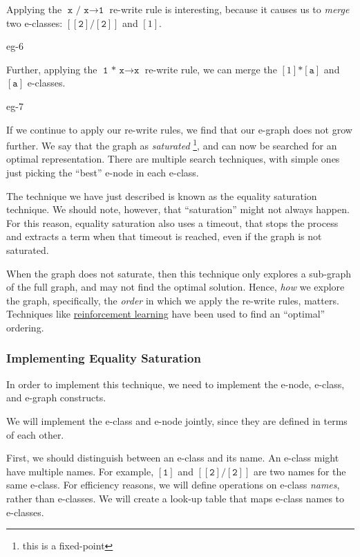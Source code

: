 Applying the $\texttt{x / x} \to \texttt{1}$ re-write rule is interesting, because it causes us to \textit{merge} two e-classes: 
$[[\texttt{2}] \texttt{/} [\texttt{2}]]$ and $[1]$.

\begin{center}
  {eg-6}
\end{center}

Further, applying the $\texttt{1 * x} \to \texttt{x}$ re-write rule, we can merge the $[1]\texttt{*}[\texttt{a}]$ and $[\texttt{a}]$ e-classes.

\begin{center}
  {eg-7}
\end{center}

If we continue to apply our re-write rules, we find that our e-graph does not grow further. We say that the graph as \textit{saturated} \footnote{this is a fixed-point}, and can 
now be searched for an optimal representation. There are multiple search techniques, with simple ones just picking the ``best'' e-node in each e-class. 

The technique we have just described is known as the equality saturation technique. We should note, however, that ``saturation'' might not always happen. 
For this reason, equality saturation also uses a timeout, that stops the process and extracts a term when that timeout is reached, even if the graph is not saturated. 

When the graph does not saturate, then this technique only explores a sub-graph of the full graph, and may not find the optimal solution. Hence, \textit{how} we explore the graph, 
specifically, the \textit{order} in which we apply the re-write rules, matters. Techniques like \href{https://www.cl.cam.ac.uk/~ey204/pubs/MPHIL_P3/2022_Zak.pdf}{reinforcement learning}
have been used to find an ``optimal'' ordering. 

\subsubsection{Implementing Equality Saturation}
In order to implement this technique, we need to implement the e-node, e-class, and e-graph constructs. 

We will implement the e-class and e-node jointly, since they are defined in terms of each other. 

First, we should distinguish between an e-class and its name. An e-class might have multiple names. For example,
$[\texttt{1}]$ and $[[\texttt{2}] \texttt{/} [\texttt{2}]]$ are two names for the same e-class. For efficiency reasons, we
will define operations on e-class \textit{names}, rather than e-classes. We will create a look-up table that maps e-class names to e-classes.

